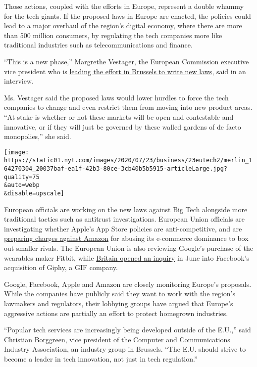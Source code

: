 Those actions, coupled with the efforts in Europe, represent a double
whammy for the tech giants. If the proposed laws in Europe are enacted,
the policies could lead to a major overhaul of the region's digital
economy, where there are more than 500 million consumers, by regulating
the tech companies more like traditional industries such as
telecommunications and finance.

``This is a new phase,'' Margrethe Vestager, the European Commission
executive vice president who is
\href{https://www.nytimes.com/2019/11/19/technology/tech-regulator-europe.html}{leading
the effort in Brussels to write new laws}, said in an interview.

Ms. Vestager said the proposed laws would lower hurdles to force the
tech companies to change and even restrict them from moving into new
product areas. ``At stake is whether or not these markets will be open
and contestable and innovative, or if they will just be governed by
these walled gardens of de facto monopolies,'' she said.

\texttt{[image: https://static01.nyt.com/images/2020/07/23/business/23eutech2/merlin\_164270304\_20037baf-ea1f-42b3-80ce-3cb40b5b5915-articleLarge.jpg?quality=75\\\&auto=webp\\\&disable=upscale]}

European officials are working on the new laws against Big Tech
alongside more traditional tactics such as antitrust investigations.
European Union officials are investigating whether Apple's App Store
policies are anti-competitive, and are
\href{https://www.nytimes.com/2020/06/11/technology/amazon-antitrust-european-union.html}{preparing
charges against Amazon} for abusing its e-commerce dominance to box out
smaller rivals. The European Union is also reviewing Google's purchase
of the wearables maker Fitbit, while
\href{https://www.gov.uk/cma-cases/facebook-inc-giphy-inc-merger-inquiry}{Britain
opened an inquiry} in June into Facebook's acquisition of Giphy, a GIF
company.

Google, Facebook, Apple and Amazon are closely monitoring Europe's
proposals. While the companies have publicly said they want to work with
the region's lawmakers and regulators, their lobbying groups have argued
that Europe's aggressive actions are partially an effort to protect
homegrown industries.

``Popular tech services are increasingly being developed outside of the
E.U.,'' said Christian Borggreen, vice president of the Computer and
Communications Industry Association, an industry group in Brussels.
``The E.U. should strive to become a leader in tech innovation, not just
in tech regulation.''

